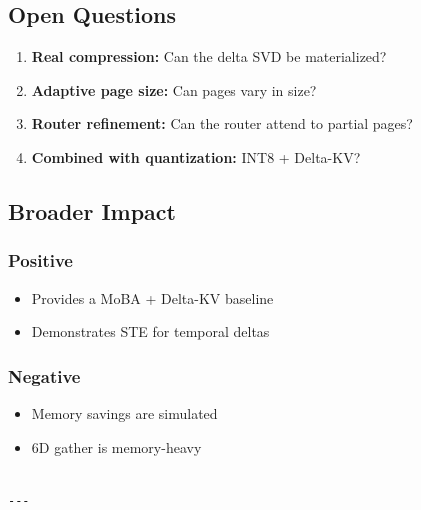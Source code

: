 \subsection{Open Questions}

\begin{enumerate}
\item \textbf{Real compression:} Can the delta SVD be materialized?
\item \textbf{Adaptive page size:} Can pages vary in size?
\item \textbf{Router refinement:} Can the router attend to partial pages?
\item \textbf{Combined with quantization:} INT8 + Delta-KV?

\end{enumerate}
\subsection{Broader Impact}

\subsubsection{Positive}
\begin{itemize}
\item Provides a MoBA + Delta-KV baseline
\item Demonstrates STE for temporal deltas

\end{itemize}
\subsubsection{Negative}
\begin{itemize}
\item Memory savings are simulated
\item 6D gather is memory-heavy
\end{itemize}
\begin{lstlisting}

---
\end{lstlisting}